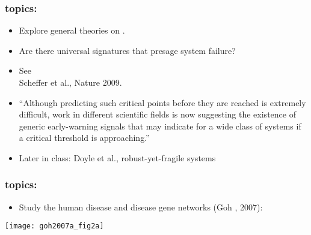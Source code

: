 \begin{frame}
  \frametitle{topics:}

  \begin{block}{}
  \begin{itemize}
  \item<1-> 
    Explore general theories on .
  \item<1->
    Are there \alert{universal signatures} that presage system failure?
  \item<2->
    See \\
    Scheffer et al., Nature 2009.\cite{scheffer2009a}
  \item<3->
    ``Although predicting
    such critical points before they are reached is extremely difficult,
    work in different scientific fields is now suggesting the existence of
    generic early-warning signals that may indicate for a wide class of
    systems if a critical threshold is approaching.''
  \item<4-> 
    Later in class: Doyle et al., robust-yet-fragile systems
  \end{itemize}
  \end{block}


\end{frame}

\begin{frame}
  \frametitle{topics:}

  \begin{block}{}
  \begin{itemize}
  \item<1-> 
    Study the human disease and disease gene networks (Goh \etal, 2007):
  \end{itemize}
  \texttt{[image: goh2007a\_fig2a]}
  \end{block}

\end{frame}

